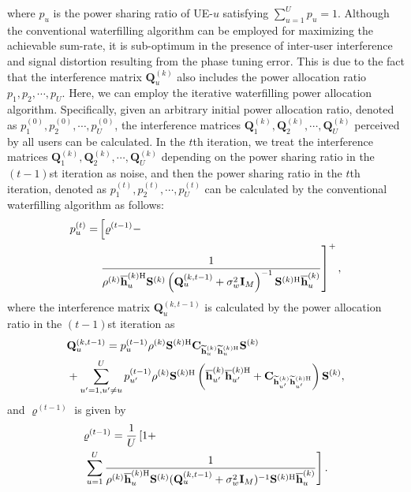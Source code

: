 \documentclass[lettersize,journal]{IEEEtran}
\theoremstyle{remark}
\begin{document}
where $p_u$ is the power sharing ratio of UE-$u$ satisfying $\sum_{u=1}^Up_u=1$. Although the conventional waterfilling algorithm can be employed for maximizing the achievable sum-rate, it is sub-optimum in the presence of inter-user interference and signal distortion resulting from the phase tuning error. This is due to the fact that the interference matrix $\mathbf{Q}_u^{(k)}$ also includes the power allocation ratio $p_1,p_2,\cdots,p_U$. Here, we can employ the iterative waterfilling power allocation algorithm. Specifically, given an arbitrary initial power allocation ratio, denoted as $p_1^{(0)},p_2^{(0)},\cdots,p_U^{(0)}$, the interference matrices $\mathbf{Q}_1^{(k)},\mathbf{Q}_2^{(k)},\cdots,\mathbf{Q}_U^{(k)}$ perceived by all users can be calculated. In the $t$th iteration, we treat the interference matrices $\mathbf{Q}_1^{(k)},\mathbf{Q}_2^{(k)},\cdots,\mathbf{Q}_U^{(k)}$ depending on the power sharing ratio in the $(t-1)$st iteration as noise, and then the power sharing ratio in the $t$th iteration, denoted as $p_1^{(t)},p_2^{(t)},\cdots,p_U^{(t)}$ can be calculated by the conventional waterfilling algorithm as follows:
\begin{align}\label{Power_Allocation_2}
    \notag p_u^{(t)}=&\left[\varrho^{(t-1)}-\right.\\
    &\left.\frac{1}{\rho^{(k)}\overline{\mathbf{h}}_u^{(k)\mathrm{H}}
    \mathbf{S}^{(k)}\left(\mathbf{Q}_u^{(k,t-1)}+\sigma_w^2\mathbf{I}_M\right)^{-1}
    \mathbf{S}^{(k)\mathrm{H}}\overline{\mathbf{h}}_u^{(k)}}\right]^{+},
\end{align}
where the interference matrix $\mathbf{Q}_u^{(k,t-1)}$ is calculated by the power allocation ratio in the $(t-1)$st iteration as
\begin{align}\label{Power_Allocation_3}
    \notag&\mathbf{Q}_u^{(k,t-1)}=p_u^{(t-1)}\rho^{(k)}\mathbf{S}^{(k)\mathrm{H}}
    \mathbf{C}_{\widetilde{\mathbf{h}}_u^{(k)}\widetilde{\mathbf{h}}_u^{(k)\mathrm{H}}}\mathbf{S}^{(k)}\\
    &+\sum_{u'=1,u'\neq u}^{U}p_{u'}^{(t-1)}\rho^{(k)}
    \mathbf{S}^{(k)\mathrm{H}}\left(\overline{\mathbf{h}}_{u'}^{(k)}\overline{\mathbf{h}}_{u'}^{(k)\mathrm{H}}
    +\mathbf{C}_{\widetilde{\mathbf{h}}_{u'}^{(k)}\widetilde{\mathbf{h}}_{u'}^{(k)\mathrm{H}}}\right)
    \mathbf{S}^{(k)},
\end{align}
and $\varrho^{(t-1)}$ is given by
\begin{align}\label{Power_Allocation_4}
    \notag&\varrho^{(t-1)}=\frac{1}{U}\left[1+\right.\\
    &\left.\sum_{u=1}^{U}\frac{1}{\rho^{(k)}\overline{\mathbf{h}}_u^{(k)
    \mathrm{H}}\mathbf{S}^{(k)}(\mathbf{Q}_u^{(k,t-1)}+\sigma_w^2\mathbf{I}_M)^{-1}
    \mathbf{S}^{(k)\mathrm{H}}\overline{\mathbf{h}}_u^{(k)}}\right].
\end{align}
\end{document}
